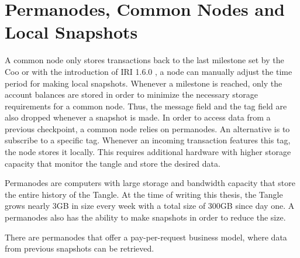 \section{Permanodes, Common Nodes and Local Snapshots}\label{permanodes}

A common node only stores transactions back to the last milestone set by the Coo or with the introduction of IRI 1.6.0 \cite{local-snapshots}, a node can manually adjust the time period for making local snapshots. Whenever a milestone is reached, only the account balances are stored in order to minimize the necessary storage requirements for a common node. Thus, the message field and the tag field are also dropped whenever a snapshot is made. In order to access data from a previous checkpoint, a common node relies on permanodes. An alternative is to subscribe to a specific tag. Whenever an incoming transaction features this tag, the node stores it locally. This requires additional hardware with higher storage capacity that monitor the tangle and store the desired data. 

Permanodes are computers with large storage and bandwidth capacity that store the entire history of the Tangle. At the time of writing this thesis, the Tangle grows nearly 3GB in size every week with a total size of 300GB since day one. A permanodes also has the ability to make snapshots in order to reduce the size. 

There are permanodes that offer a pay-per-request business model, where data from previous snapshots can be retrieved.